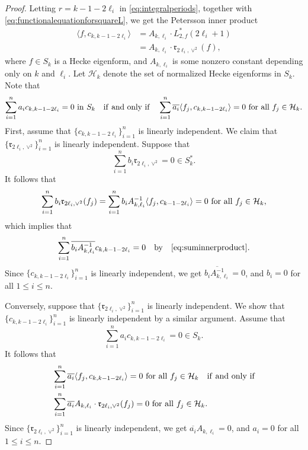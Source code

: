 \documentclass[11pt,letterpaper,reqno]{amsart}
\numberwithin{figure}{section}
\numberwithin{table}{section}
\theoremstyle{definition}
\theoremstyle{plain}
\theoremstyle{definition}
\theoremstyle{definition}
\theoremstyle{remark}
\numberwithin{equation}{section}
\theoremstyle{remark}
\begin{document}
\begin{proof}
Letting $r=k-1-2\ell_i$ in \eqref{eq:integralperiods}, together with \eqref{eq:functionalequationforsquareL}, we get the Petersson inner product
\begin{align}
    \langle f,c_{k,k-1-2\ell_i}\rangle&=A_{k,\ell_i}\cdot L^{\ast}_{2,f}(2\ell_i+1)\\&=A_{k,\ell_i}\cdot \mathfrak{r}_{2\ell_i,\vee^2}(f)
,\label{eq:integrationrepresentationofperiods}\end{align}
where $f\in S_k$ is a Hecke eigenform, and $A_{k,\ell_i}$ is some nonzero constant depending only on $k$ and $\ell_i$. Let $\mathcal{H}_k$ denote the set of normalized Hecke eigenforms in $S_k$. Note that
\begin{align}
\sum_{i=1}^na_ic_{k,k-1-2\ell_i}=0~{\rm in}~S_k\quad{\rm if~and~only~if}\quad\sum_{i=1}^n\overline{a_i}\langle f_j,c_{k,k-1-2\ell_i}\rangle=0~{\rm for~all}~f_j\in\mathcal{H}_k.\label{eq:suminnerproduct}
\end{align}
First, assume that $\{c_{k,k-1-2\ell_i}\}_{i=1}^n$ is linearly independent. We claim that $\{\mathfrak{r}_{2\ell_i,\vee^2}\}_{i=1}^n$
is linearly independent. Suppose that
$$\sum_{i=1}^n b_i\mathfrak{r}_{2\ell_{i},\vee^2}=0\in S_k^{\ast}.$$ 
It follows that 
\begin{align}
    \sum_{i=1}^nb_i \mathfrak{r}_{2\ell_i,\vee^2}(f_j)=\sum_{i=1}^nb_iA_{k,\ell_i}^{-1}\langle f_j,c_{k-1-2\ell_i}\rangle=0~{\rm for~all}~f_j\in\mathcal{H}_k,
\end{align}
which implies that
\begin{align}
    \sum_{i=1}^n\overline{b_iA_{k,\ell_i}^{-1}}c_{k,k-1-2\ell_i}=0\quad{\rm by}\quad \eqref{eq:suminnerproduct}.
\end{align}
Since $\{c_{k,k-1-2\ell_i}\}_{i=1}^n$ is linearly independent, we get $\overline{b_iA_{k,\ell_i}^{-1}}=0$, and $b_i=0$ for all $1\leq i\leq n$. 

Conversely, suppose that $\{\mathfrak{r}_{2\ell_i,\vee^2}\}_{i=1}^n$
is linearly independent. We show that $\{c_{k,k-1-2\ell_i}\}_{i=1}^n$ is linearly independent by a similar argument. Assume that
$$\sum_{i=1}^n a_ic_{k,k-1-2\ell_i}=0\in S_k.$$ 
It follows that
\begin{align}&\sum_{i=1}^n\overline{a_i}\langle f_j,c_{k,k-1-2\ell_i}\rangle=0~{\rm for~all}~f_j\in\mathcal{H}_k \quad {\rm if~and~only~if} \\ &\sum_{i=1}^n\overline{a_i}A_{k,\ell_i}\cdot \mathfrak{r}_{2\ell_i, \vee^2}(f_j)=0~{\rm for~all}~f_j\in\mathcal{H}_k.\end{align}
Since $\{\mathfrak{r}_{2\ell_i,\vee^2}\}_{i=1}^n$
is linearly independent, we get $\overline{a_i}A_{k,\ell_i}=0$, and $a_i=0$ for all $1\leq i\leq n$. 
\end{proof}
\end{document}
